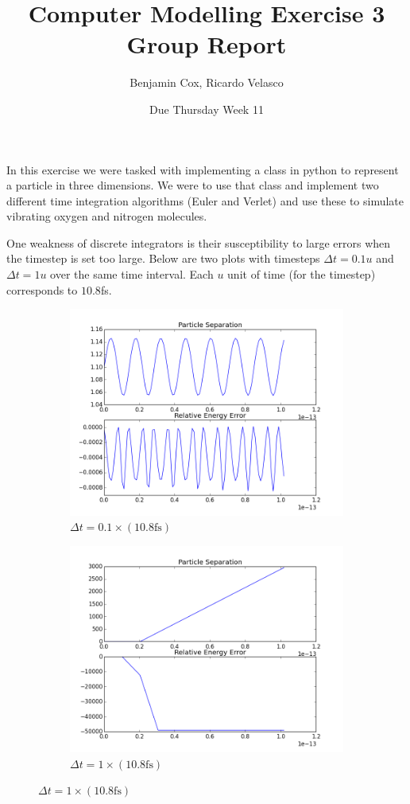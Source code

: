 \documentclass[12pt]{article}
\author{Benjamin Cox, Ricardo Velasco}
\title{Computer Modelling Exercise 3 Group Report}
\date{Due Thursday Week 11}
\begin{document}
	{\let\newpage\relax\maketitle}
	
	In this exercise we were tasked with implementing a class in python to represent a particle in three dimensions. We were to use that class and implement two different time integration algorithms (Euler and Verlet) and use these to simulate vibrating oxygen and nitrogen molecules. 
	
	One weakness of discrete integrators is their susceptibility to large errors when the timestep is set too large. Below are two plots with timesteps $\Delta t = 0.1u$ and $\Delta t = 1u$ over the same time interval. Each $u$ unit of time (for the timestep) corresponds to $10.8$fs.
	
	\begin{figure}[H]
		\centering
		\begin{subfigure}{0.45\textwidth}
			\includegraphics[width=\textwidth]{largedt}
			\caption*{$\Delta t = 0.1\times(10.8\text{fs})$}
		\end{subfigure}
		\begin{subfigure}{0.45\textwidth}
			\includegraphics[width=\textwidth]{largerdt}
			\caption*{$\Delta t = 1\times(10.8\text{fs})$}
		\end{subfigure}
	\end{figure}
	
\end{document}
